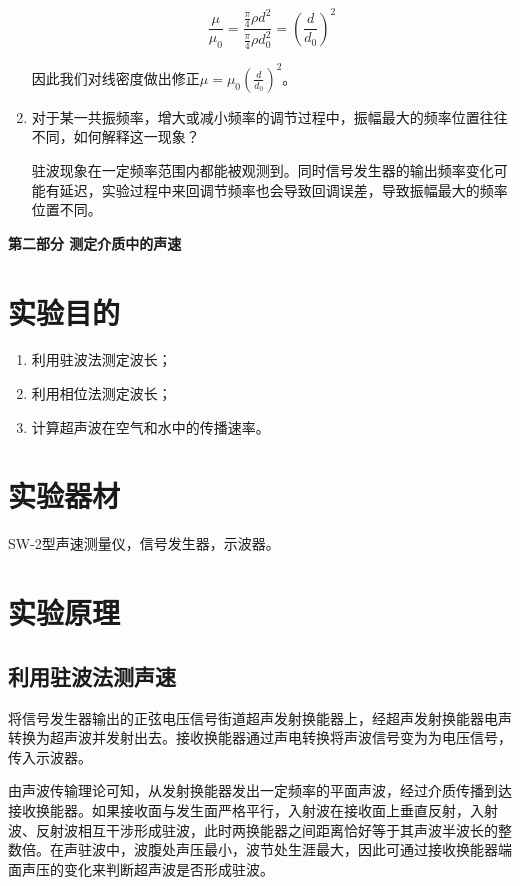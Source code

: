 \documentclass[12pt]{article}
\begin{document}
\begin{enumerate}
    \[
        \frac{\mu}{\mu_0}=\frac{\frac{\pi}{4}\rho d^2}{\frac{\pi}{4}\rho d_0^2}=(\frac{d}{d_0})^2
    \]

    因此我们对线密度做出修正$\mu=\mu_0(\frac{d}{d_0})^2$。

    \item {\kaishu 对于某一共振频率，增大或减小频率的调节过程中，振幅最大的频率位置往往不同，如何解释这一现象？}
    
    驻波现象在一定频率范围内都能被观测到。同时信号发生器的输出频率变化可能有延迟，实验过程中来回调节频率也会导致回调误差，导致振幅最大的频率位置不同。
\end{enumerate}

\setcounter{section}{0}
\newpage
\begin{center}
{\Large \textbf{第二部分 \quad 测定介质中的声速}}
\end{center}

\section{实验目的}
\begin{enumerate}
    \item 利用驻波法测定波长；
    \item 利用相位法测定波长；
    \item 计算超声波在空气和水中的传播速率。
\end{enumerate}

\section{实验器材}
SW-2型声速测量仪，信号发生器，示波器。

\section{实验原理}
\subsection{利用驻波法测声速}
将信号发生器输出的正弦电压信号街道超声发射换能器上，经超声发射换能器电声转换为超声波并发射出去。接收换能器通过声电转换将声波信号变为为电压信号，传入示波器。
	
由声波传输理论可知，从发射换能器发出一定频率的平面声波，经过介质传播到达接收换能器。如果接收面与发生面严格平行，入射波在接收面上垂直反射，入射波、反射波相互干涉形成驻波，此时两换能器之间距离恰好等于其声波半波长的整数倍。在声驻波中，波腹处声压最小，波节处生涯最大，因此可通过接收换能器端面声压的变化来判断超声波是否形成驻波。
\end{document}
